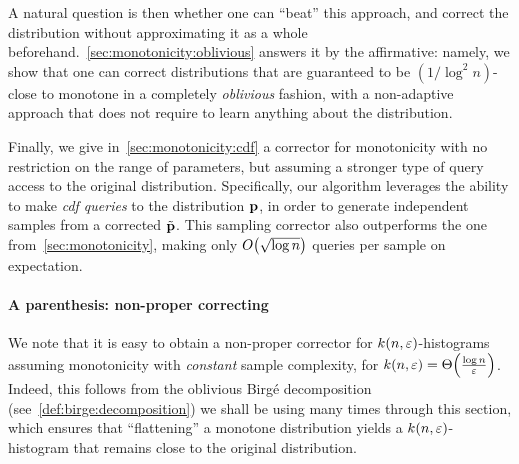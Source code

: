 A natural question is then whether one can ``beat'' this approach, and correct the distribution without approximating it as a whole beforehand.~\cref{sec:monotonicity:oblivious} answers it by the affirmative: namely, we show that one can correct distributions that are guaranteed to be $(1/\log^2 n)$-close to monotone in a completely \emph{oblivious} fashion, with a non-adaptive approach that does not require to learn anything about the distribution.

Finally, we give in~\cref{sec:monotonicity:cdf} a corrector for monotonicity with no restriction on the range of parameters, but assuming a stronger type of query access to the original distribution. {Specifically}, our algorithm leverages the ability to make \emph{cdf queries} to the distribution $\mathbf{p}$, in order to generate independent samples from a corrected $\tilde{\mathbf{p}}$. This sampling corrector also outperforms the one from~\cref{sec:monotonicity}, making only $\bigO{\sqrt{\log n}}$ queries per sample on expectation.

{\paragraph{A parenthesis: non-proper correcting} We note that it is easy to obtain a non-proper corrector for $k(n,\varepsilon)$-histograms assuming monotonicity with \emph{constant} sample complexity, for $k(n,\eps) = \bigTheta{\frac{\log n}{\eps}}$. Indeed, this follows from the oblivious Birg\'e decomposition {(see~\cref{def:birge:decomposition})} we shall be using many times through this section, which ensures that ``flattening'' a monotone distribution yields a $k(n,\varepsilon)$-histogram that remains close to the original distribution.}

